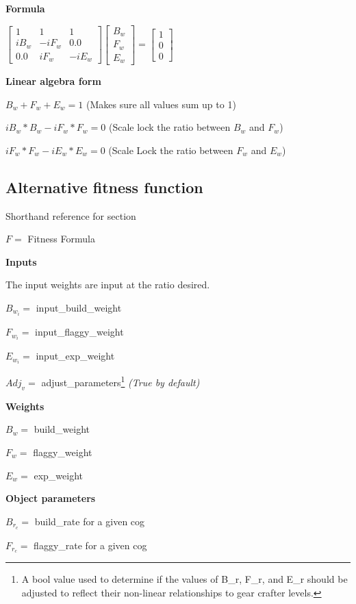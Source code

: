 \documentclass[12pt, letterpaper]{article}
\begin{document}
\textbf{Formula}

$\begin{bmatrix}
1 & 1 & 1\\
iB_w & -iF_w & 0.0\\
0.0 & iF_w & -iE_w
\end{bmatrix}
\begin{bmatrix}
B_w\\
F_w\\
E_w
\end{bmatrix}
=
\begin{bmatrix}
1\\
0\\
0
\end{bmatrix}$

\textbf{Linear algebra form}

$B_w+F_w+E_w = 1$ (Makes sure all values sum up to 1)

$iB_w*B_w-iF_w*F_w = 0$ (Scale lock the ratio between $B_w$ and $F_w$)

$iF_w*F_w-iE_w*E_w = 0$ (Scale Lock the ratio between $F_w$ and $E_w$)

\clearpage

\subsection{Alternative fitness function}

Shorthand reference for section

$F =$ Fitness Formula\

\textbf{Inputs}

The input weights are input at the ratio desired.

$B_{w_i} =$ input\_build\_weight

$F_{w_i} =$ input\_flaggy\_weight

$E_{w_i} =$ input\_exp\_weight

$Adj_v =$ adjust\_parameters\footnote{A bool value used to determine if the values of B\_r, F\_r, and E\_r should be adjusted to reflect their non-linear relationships to gear crafter levels.} \textit{(True by default)}

\textbf{Weights}

$B_w =$ build\_weight

$F_w =$ flaggy\_weight

$E_w =$ exp\_weight

\textbf{Object parameters}

$B_{r_c} =$ build\_rate for a given cog

$F_{r_c} =$ flaggy\_rate for a given cog
\end{document}
